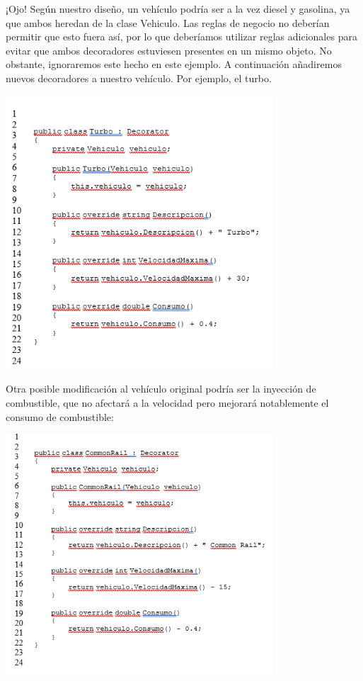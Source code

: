 \begin{flushleft}
¡Ojo! Según nuestro diseño, un vehículo podría ser a la vez diesel y gasolina, ya que ambos heredan de la clase Vehiculo. Las reglas de negocio no deberían permitir que esto fuera así, por lo que deberíamos utilizar reglas adicionales para evitar que ambos decoradores estuviesen presentes en un mismo objeto. No obstante, ignoraremos este hecho en este ejemplo.
A continuación añadiremos nuevos decoradores a nuestro vehículo. Por ejemplo, el turbo.

\begin{center}
	\includegraphics[width=10cm]{./Imagenes/decorator10} 
	\end{center}

Otra posible modificación al vehículo original podría ser la inyección de combustible, que no afectará a la velocidad pero mejorará notablemente el consumo de combustible:
\begin{center}
	\includegraphics[width=10cm]{./Imagenes/decorator11} 
	\end{center}


\end{flushleft}
